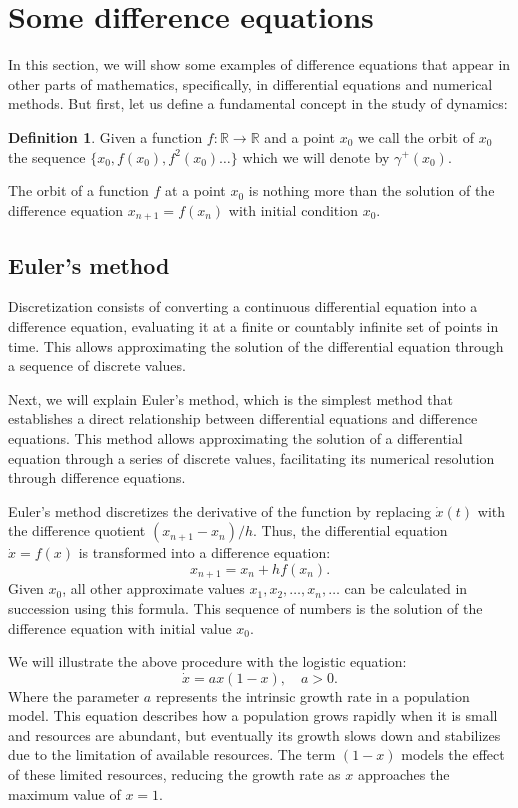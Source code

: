 \documentclass[12pt,a4paper]{report}
\theoremstyle{definition}
\newtheorem{definicion}{Definition}[section]
\begin{document}
\section{Some difference equations}

In this section, we will show some examples of difference equations that appear in other parts of mathematics, specifically, in differential equations and numerical methods. But first, let us define a fundamental concept in the study of dynamics:

\begin{definicion} 
Given a function $f: \mathbb{R} \rightarrow \mathbb{R}$ and a point $x_0$ we call the orbit of $x_0$ the sequence $ \{x_0, f(x_0), f^2(x_0) \dots \}$ which we will denote by $\gamma^+(x_0)$.
\end{definicion}

The orbit of a function $f$ at a point $x_0$ is nothing more than the solution of the difference equation $x_{n+1} = f(x_n)$ with initial condition $x_0$.

\subsection{Euler's method}

Discretization consists of converting a continuous differential equation into a difference equation, evaluating it at a finite or countably infinite set of points in time. This allows approximating the solution of the differential equation through a sequence of discrete values.

Next, we will explain Euler's method, which is the simplest method that establishes a direct relationship between differential equations and difference equations. This method allows approximating the solution of a differential equation through a series of discrete values, facilitating its numerical resolution through difference equations.

Euler's method discretizes the derivative of the function by replacing \(\dot{x}(t)\) with the difference quotient \((x_{n+1} - x_n)/h\). Thus, the differential equation \(\dot{x} = f(x)\) is transformed into a difference equation:
\[
x_{n+1} = x_n + h f(x_n).
\]
%
Given $x_0$, all other approximate values $x_1, x_2, \ldots, x_n, \ldots$ can be calculated in succession using this formula. This sequence of numbers is the solution of the difference equation with initial value $x_0$.



We will illustrate the above procedure with the logistic equation:
\[
\dot{x} = ax(1 - x), \quad  a > 0.
\]
%
 Where the parameter \( a \) represents the intrinsic growth rate in a population model. This equation describes how a population grows rapidly when it is small and resources are abundant, but eventually its growth slows down and stabilizes due to the limitation of available resources. The term \( (1 - x) \) models the effect of these limited resources, reducing the growth rate as \( x \) approaches the maximum value of \( x = 1 \).
\end{document}
